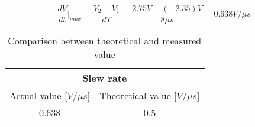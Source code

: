     $$\dfrac{dV}{dt} \vert _{max} = \frac{V_2-V_1}{dT} = \frac{2.75V-(-2.35) V}{8\mu s} = 0.638 V/\mu s$$

    \begin{table}[htbp]
     \centering
       \begin{tabular}{c|c}
        \multicolumn{2}{c}{Slew rate}\\
        \hline
        Actual value [$V/\mu s$] & Theoretical value [$V/\mu s$] \\
       \hline
        0.638          & 0.5 \\
       \end{tabular}%
     \caption{Comparison between theoretical and measured value}
     \label{tab:addlabel}%
   \end{table}%